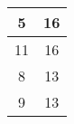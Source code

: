 \begin{table}[H]
\begin{tabular}{cc}
\multicolumn{1}{|c|}{5}                                                        & \multicolumn{1}{c|}{16}                                                             \\ \hline
\multicolumn{1}{|c|}{11}                                                        & \multicolumn{1}{c|}{16}                                                             \\ \hline
\multicolumn{1}{|c|}{8}                                                        & \multicolumn{1}{c|}{13}                                                             \\ \hline
\multicolumn{1}{|c|}{9}                                                        & \multicolumn{1}{c|}{13}                                                             \\ \hline
\end{tabular}\end{table}